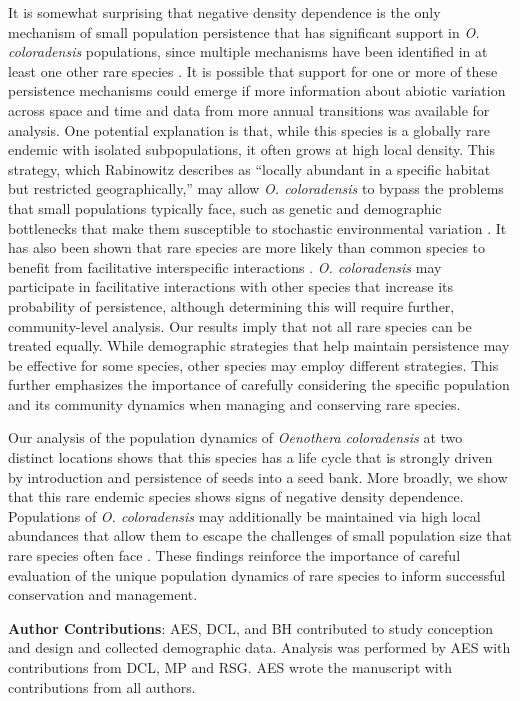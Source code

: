 \documentclass[12pt, letterpaper]{article}
\begin{document}
It is somewhat surprising that negative density dependence is the only mechanism of small population persistence that has significant support in \textit{O. coloradensis} populations, since multiple mechanisms have been identified in at least one other rare species \cite{Dibner2019}. It is possible that support for one or more of these persistence mechanisms could emerge if more information about abiotic variation across space and time and data from more annual transitions was available for analysis. One potential explanation is that, while this species is a globally rare endemic with isolated subpopulations, it often grows at high local density. This strategy, which Rabinowitz describes as “locally abundant in a specific habitat but restricted geographically,” may allow \textit{O. coloradensis} to bypass the problems that small populations typically face, such as genetic and demographic bottlenecks that make them susceptible to stochastic environmental variation \cite{Rabinowitz1981SevenRarity}. It has also been shown that rare species are more likely than common species to benefit from facilitative interspecific interactions \cite{Calatayud2020PositiveAssemblages}. \textit{O. coloradensis} may participate in facilitative interactions with other species that increase its probability of persistence, although determining this will require further, community-level analysis. Our results imply that not all rare species can be treated equally. While demographic strategies that help maintain persistence may be effective for some species, other species may employ different strategies. This further emphasizes the importance of carefully considering the specific population and its community dynamics when managing and conserving rare species.  

Our analysis of the population dynamics of \textit{Oenothera coloradensis} at two distinct locations shows that this species has a life cycle that is strongly driven by introduction and persistence of seeds into a seed bank. More broadly, we show that this rare endemic species shows signs of negative density dependence. Populations of \textit{O. coloradensis} may additionally be maintained via high local abundances that allow them to escape the challenges of small population size that rare species often face \cite{Rabinowitz1981SevenRarity}. These findings reinforce the importance of careful evaluation of the unique population dynamics of rare species to inform successful conservation and management.  

\small{
\textbf{Author Contributions}: AES, DCL, and BH contributed to study conception and design and collected demographic data. Analysis was performed by AES with contributions from DCL, MP and RSG. AES wrote the manuscript with contributions from all authors. 
} 
\end{document}
